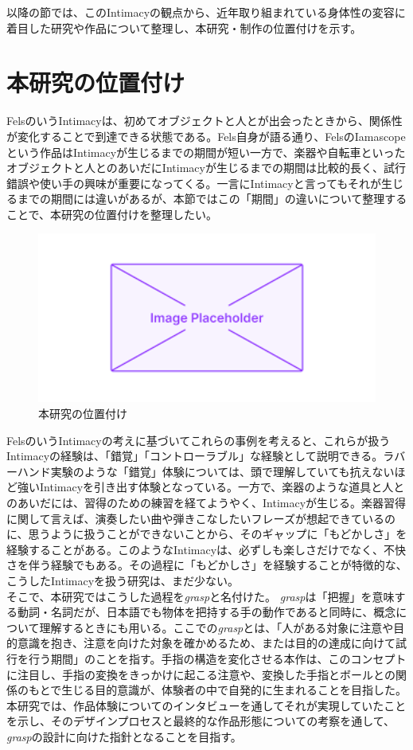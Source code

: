 以降の節では、このIntimacyの観点から、近年取り組まれている身体性の変容に着目した研究や作品について整理し、本研究・制作の位置付けを示す。

\section{本研究の位置付け}
FelsのいうIntimacyは、初めてオブジェクトと人とが出会ったときから、関係性が変化することで到達できる状態である。Fels自身が語る通り、FelsのIamascopeという作品はIntimacyが生じるまでの期間が短い一方で、楽器や自転車といったオブジェクトと人とのあいだにIntimacyが生じるまでの期間は比較的長く、試行錯誤や使い手の興味が重要になってくる。一言にIntimacyと言ってもそれが生じるまでの期間には違いがあるが、本節ではこの「期間」の違いについて整理することで、本研究の位置付けを整理したい。

\begin{figure}[H]
  \centering
  \includegraphics[width=15cm]{img/placeholder.png}
  \caption{本研究の位置付け}
  \label{fig:position}
\end{figure}

FelsのいうIntimacyの考えに基づいてこれらの事例を考えると、これらが扱うIntimacyの経験は、「錯覚」「コントローラブル」な経験として説明できる。ラバーハンド実験のような「錯覚」体験については、頭で理解していても抗えないほど強いIntimacyを引き出す体験となっている。一方で、楽器のような道具と人とのあいだには、習得のための練習を経てようやく、Intimacyが生じる。楽器習得に関して言えば、演奏したい曲や弾きこなしたいフレーズが想起できているのに、思うように扱うことができないことから、そのギャップに「もどかしさ」を経験することがある。このようなIntimacyは、必ずしも楽しさだけでなく、不快さを伴う経験でもある。その過程に「もどかしさ」を経験することが特徴的な、こうしたIntimacyを扱う研究は、まだ少ない。\\
そこで、本研究ではこうした過程を\textit{grasp}と名付けた。
\textit{grasp}は「把握」を意味する動詞・名詞だが、日本語でも物体を把持する手の動作であると同時に、概念について理解するときにも用いる。ここでの\textit{grasp}とは、「人がある対象に注意や目的意識を抱き、注意を向けた対象を確かめるため、または目的の達成に向けて試行を行う期間」のことを指す。手指の構造を変化させる本作は、このコンセプトに注目し、手指の変換をきっかけに起こる注意や、変換した手指とボールとの関係のもとで生じる目的意識が、体験者の中で自発的に生まれることを目指した。
本研究では、作品体験についてのインタビューを通してそれが実現していたことを示し、そのデザインプロセスと最終的な作品形態についての考察を通して、\textit{grasp}の設計に向けた指針となることを目指す。

